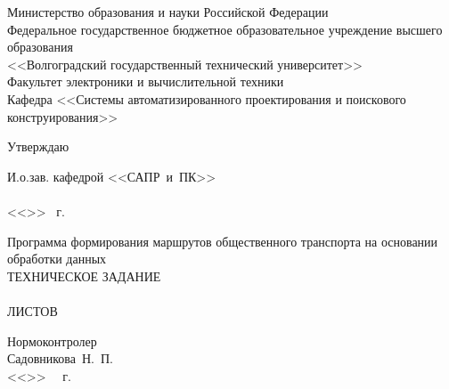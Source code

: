 \thispagestyle{empty}
\begin{center}
    Министерство образования и науки Российской Федерации \\
    Федеральное государственное бюджетное образовательное учреждение высшего образования\\
    <<Волгоградский государственный технический университет>>\\
    Факультет электроники и вычислительной техники\\
    Кафедра <<Системы автоматизированного проектирования и поискового конструирования>>
    \vspace{1em}
\end{center}
\begin{flushright}
    \begin{center}
        \hspace*{9.7em}Утверждаю
    \end{center}
    И.о.зав. кафедрой <<САПР~и~ПК>>\\
    \hspace{0.5em}\\
    \vspace{0.5em}<<\underline{\hspace{2.5em}}>> \underline{\hspace{8.5em}} \the\year\ г.
\end{flushright}
\vspace{1em}
\begin{center}
    Программа формирования маршрутов общественного транспорта на основании обработки данных\\
    ТЕХНИЧЕСКОЕ ЗАДАНИЕ\\
    \vspace{2em}
    \MASTERWORK\\
    ЛИСТОВ \pageref{LastPage}
\end{center}
\vspace{5em}
\begin{minipage}[t]{0.6\textwidth}
    \vspace{4em}
    \begin{flushleft}
        Нормоконтролер\\
        Садовникова~Н.~П.\\
        <<\LINE{1.5em}>>\ \LINE{7em} \the\year\ г.
    \end{flushleft}
\end{minipage}
